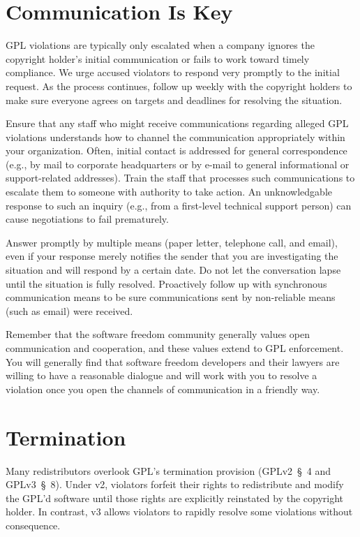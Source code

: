 \section{Communication Is Key}

GPL violations are typically only escalated when a company ignores the
copyright holder's initial communication or fails to work toward timely
compliance.  We urge accused violators to respond very promptly to the
initial request.  As the process continues, follow up weekly with the
copyright holders to make sure everyone agrees on targets and deadlines
for resolving the situation.

Ensure that any staff who might receive communications regarding alleged
GPL violations understands how to channel the communication appropriately
within your organization.  Often, initial contact is addressed for general
correspondence (e.g., by mail to corporate headquarters or by e-mail to
general informational or support-related addresses).  Train the staff that
processes such communications to escalate them to someone with authority
to take action.  An unknowledgable response to such an inquiry (e.g., from
a first-level technical support person) can cause negotiations to fail
prematurely.

Answer promptly by multiple means (paper letter, telephone call, and
email), even if your response merely notifies the sender that you are
investigating the situation and will respond by a certain date.  Do not
let the conversation lapse until the situation is fully resolved.
Proactively follow up with synchronous communication means to be sure
communications sent by non-reliable means (such as email) were received.

Remember that the software freedom community generally values open communication and
cooperation, and these values extend to GPL enforcement.  You will
generally find that software freedom developers and their lawyers are willing to
have a reasonable dialogue and will work with you to resolve a violation
once you open the channels of communication in a friendly way.

\section{Termination}

Many redistributors overlook GPL's termination provision (GPLv2~\S~4 and
GPLv3~\S~8).  Under v2, violators forfeit their rights to redistribute and
modify the GPL'd software until those rights are explicitly reinstated by
the copyright holder.  In contrast, v3 allows violators to rapidly resolve
some violations without consequence.

